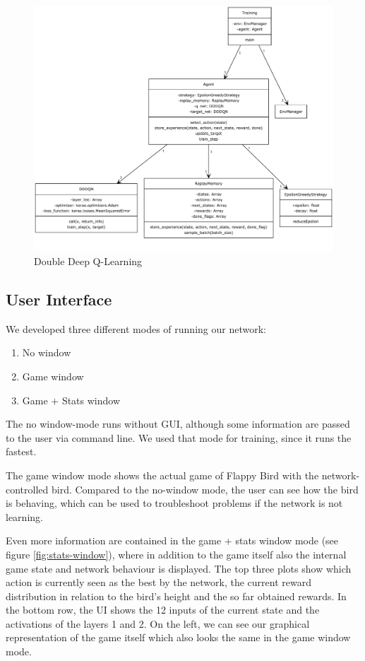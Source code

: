\par
\begin{figure}
    \centering
    \includegraphics[width=\textwidth]{media/network.pdf}
    \caption{Double Deep Q-Learning}
    \label{fig:uml-q-learning}
\end{figure}


\subsection{User Interface}\label{sec:ui}

We developed three different modes of running our network:
\begin{enumerate}
    \item No window
    \item Game window
    \item Game + Stats window
\end{enumerate}
The no window-mode runs without GUI, although some information are passed to the user via command line. We used that mode for training, since it runs the fastest.
\par
The game window mode shows the actual game of Flappy Bird with the network-controlled bird. Compared to the no-window mode, the user can see how the bird is behaving, which can be used to troubleshoot problems if the network is not learning.
\par
Even more information are contained in the game + stats window mode (see figure \ref{fig:stats-window}), where in addition to the game itself also the internal game state and network behaviour is displayed. The top three plots show which action is currently seen as the best by the network, the current reward distribution in relation to the bird's height and the so far obtained rewards. In the bottom row, the UI shows the 12 inputs of the current state and the activations of the layers 1 and 2. On the left, we can see our graphical representation of the game itself which also looks the same in the game window mode.

